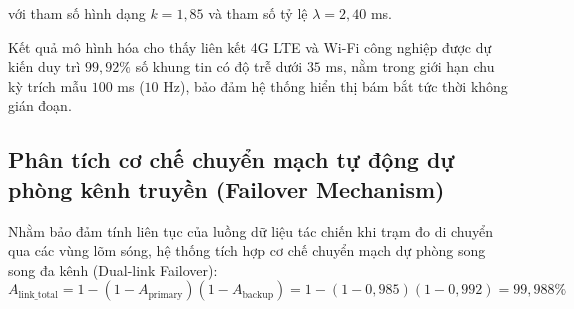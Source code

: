 với tham số hình dạng $k = 1{,}85$ và tham số tỷ lệ $\lambda = 2{,}40$ ms.

\begin{table}[H]
\centering
\caption{Kết quả mô hình hóa độ trễ truyền gói tin và xác suất giật độ trễ qua các kênh liên kết vô tuyến}
\label{tab:wireless-network-latency-w15}
\end{table}

Kết quả mô hình hóa cho thấy liên kết 4G LTE và Wi-Fi công nghiệp được dự kiến duy trì $99{,}92\%$ số khung tin có độ trễ dưới $35$ ms, nằm trong giới hạn chu kỳ trích mẫu $100$ ms ($10$ Hz), bảo đảm hệ thống hiển thị bám bắt tức thời không gián đoạn.

\subsection{Phân tích cơ chế chuyển mạch tự động dự phòng kênh truyền (Failover Mechanism)}

\hspace{0.5cm} Nhằm bảo đảm tính liên tục của luồng dữ liệu tác chiến khi trạm đo di chuyển qua các vùng lõm sóng, hệ thống tích hợp cơ chế chuyển mạch dự phòng song song đa kênh (Dual-link Failover):
\begin{equation}
A_{\text{link\_total}} = 1 - (1 - A_{\text{primary}}) (1 - A_{\text{backup}}) = 1 - (1 - 0{,}985) (1 - 0{,}992) = 99{,}988\%
\label{eq:dual-link-availability-formula-w15}
\end{equation}

